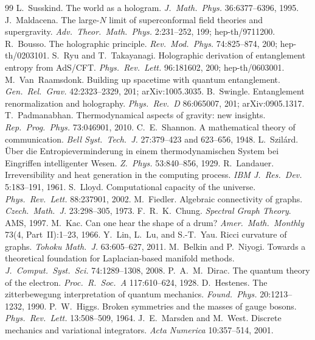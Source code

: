 \documentclass[10pt,twocolumn]{article}
\theoremstyle{definition}
\begin{document}
\begin{thebibliography}{99}
 L.~Susskind. The world as a hologram. \emph{J.\ Math.\ Phys.} 36:6377--6396, 1995.
 J.~Maldacena. The large-$N$ limit of superconformal field theories and supergravity. \emph{Adv.\ Theor.\ Math.\ Phys.} 2:231--252, 199; hep-th/9711200.
 R.~Bousso. The holographic principle. \emph{Rev.\ Mod.\ Phys.} 74:825--874, 200; hep-th/0203101.
 S.~Ryu and T.~Takayanagi. Holographic derivation of entanglement entropy from AdS/CFT. \emph{Phys.\ Rev.\ Lett.} 96:181602, 200; hep-th/0603001.
 M.~Van~Raamsdonk. Building up spacetime with quantum entanglement. \emph{Gen.\ Rel.\ Grav.} 42:2323--2329, 201; arXiv:1005.3035.
 B.~Swingle. Entanglement renormalization and holography. \emph{Phys.\ Rev.\ D} 86:065007, 201; arXiv:0905.1317.
 T.~Padmanabhan. Thermodynamical aspects of gravity: new insights. \emph{Rep.\ Prog.\ Phys.} 73:046901, 2010.
 C.~E.~Shannon. A mathematical theory of communication. \emph{Bell Syst.\ Tech.\ J.} 27:379--423 and 623--656, 1948.
 L.~Szil\'ard. \"Uber die Entropieverminderung in einem thermodynamischen System bei Eingriffen intelligenter Wesen. \emph{Z.\ Phys.} 53:840--856, 1929.
 R.~Landauer. Irreversibility and heat generation in the computing process. \emph{IBM J.\ Res.\ Dev.} 5:183--191, 1961.
 S.~Lloyd. Computational capacity of the universe. \emph{Phys.\ Rev.\ Lett.} 88:237901, 2002.
 M.~Fiedler. Algebraic connectivity of graphs. \emph{Czech.\ Math.\ J.} 23:298--305, 1973.
 F.~R.~K.~Chung. \emph{Spectral Graph Theory}. AMS, 1997.
 M.~Kac. Can one hear the shape of a drum? \emph{Amer.\ Math.\ Monthly} 73(4, Part~II):1--23, 1966.
 Y.~Lin, L.~Lu, and S.-T.~Yau. Ricci curvature of graphs. \emph{Tohoku Math.\ J.} 63:605--627, 2011.
 M.~Belkin and P.~Niyogi. Towards a theoretical foundation for Laplacian-based manifold methods. \emph{J.\ Comput.\ Syst.\ Sci.} 74:1289--1308, 2008.
 P.~A.~M.~Dirac. The quantum theory of the electron. \emph{Proc.\ R.\ Soc.\ A} 117:610--624, 1928.
 D.~Hestenes. The zitterbewegung interpretation of quantum mechanics. \emph{Found.\ Phys.} 20:1213--1232, 1990.
 P.~W.~Higgs. Broken symmetries and the masses of gauge bosons. \emph{Phys.\ Rev.\ Lett.} 13:508--509, 1964.
 J.~E.~Marsden and M.~West. Discrete mechanics and variational integrators. \emph{Acta Numerica} 10:357--514, 2001.

\end{thebibliography}
\end{document}

